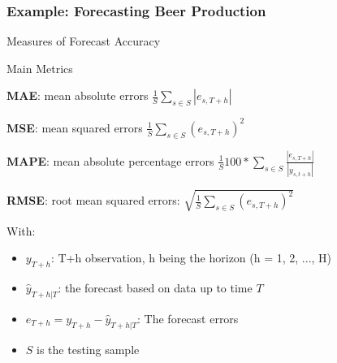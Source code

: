 \documentclass{beamer}
\newenvironment{wideitemize}{\itemize\addtolength{\itemsep}{10pt}}{\enditemize}
\begin{document}
\begin{frame}
  \frametitle{Example: Forecasting Beer Production}
\end{frame}

\begin{frame}{Measures of Forecast Accuracy}

  \begin{alertblock}{Main Metrics}
    \begin{wideitemize}
    \item \textbf{MAE}: mean absolute errors $\frac{1}{S}\sum_{s \in S} |e_{s, T+h}|$
    \item \textbf{MSE}: mean squared errors $\frac{1}{S}\sum_{s \in S} (e_{s, T+h})^2$
    \item \textbf{MAPE}: mean absolute percentage errors $\frac{1}{S}100*\sum_{s \in S} \frac{|e_{s, T+h}|}{|y_{s, t+h}|}$
    \item \textbf{RMSE}: root mean squared errors: $\sqrt{\frac{1}{S}\sum_{s \in S} (e_{s, T+h})^2}$
    \end{wideitemize}
  \end{alertblock}

  With:\\
  
  \begin{itemize}
  \item $y_{T+h}$: T+h observation, h being the horizon (h = 1, 2, ..., H)
  \item $\hat{y}_{T+h|T}$: the forecast based on data up to time $T$
  \item $e_{T+h} = y_{T+h} - \hat{y}_{T+h|T}$: The forecast errors
  \item $S$ is the testing sample
  \end{itemize}
\end{frame}
\end{document}
